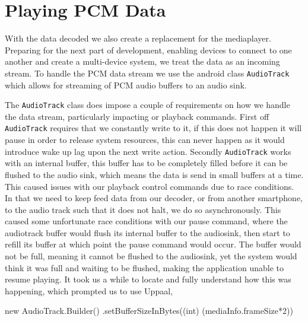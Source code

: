 \section{Playing \ac{PCM} Data}
With the data decoded we also create a replacement for the mediaplayer.
Preparing for the next part of development, enabling devices to connect to one another and create a multi-device system, we treat the data as an incoming stream.
To handle the \ac{PCM} data stream we use the android class \texttt{AudioTrack} which allows for streaming of PCM audio buffers to an audio sink.

The \texttt{AudioTrack} class does impose a couple of requirements on how we handle the data stream, particularly impacting or playback commands.
First off \texttt{AudioTrack} requires that we constantly write to it, if this does not happen it will pause in order to release system resources, this can never happen as it would introduce wake up lag upon the next write action.
Secondly \texttt{AudioTrack} works with an internal buffer, this buffer has to be completely filled before it can be flushed to the audio sink, which means the data is send in small buffers at a time.\cite{audiotrack}
This caused issues with our playback control commands due to race conditions.
In that we need to keep feed data from our decoder, or from another smartphone, to the audio track such that it does not halt, we do so asynchronously.
This caused some unfortunate race conditions with our pause command, where the audiotrack buffer would flush its internal buffer to the audiosink, then start to refill its buffer at which point the pause command would occur.
The buffer would not be full, meaning it cannot be flushed to the audiosink, yet the system would think it was full and waiting to be flushed, making the application unable to resume playing.
It took us a while to locate and fully understand how this was happening, which prompted us to use Uppaal,




        new AudioTrack.Builder()
                 .setBufferSizeInBytes((int) (mediaInfo.frameSize*2))


